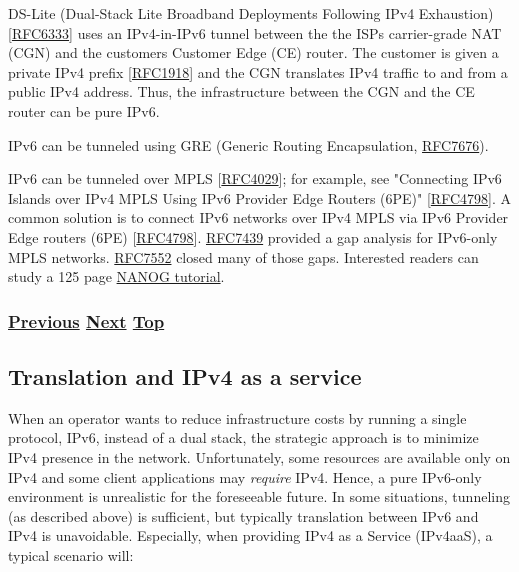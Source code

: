\documentclass[
]{article}
\begin{document}
DS-Lite (Dual-Stack Lite Broadband Deployments Following IPv4
Exhaustion)
{[}\href{https://www.rfc-editor.org/info/rfc6333}{RFC6333}{]} uses an
IPv4-in-IPv6 tunnel between the the ISP\textquotesingle s carrier-grade
NAT (CGN) and the customer\textquotesingle s Customer Edge (CE) router.
The customer is given a private IPv4 prefix
{[}\href{https://www.rfc-editor.org/info/rfc1918}{RFC1918}{]} and the
CGN translates IPv4 traffic to and from a public IPv4 address. Thus, the
infrastructure between the CGN and the CE router can be pure IPv6.

IPv6 can be tunneled using GRE (Generic Routing Encapsulation,
\href{https://www.rfc-editor.org/info/rfc7676}{RFC7676}).

IPv6 can be tunneled over MPLS
{[}\href{https://www.rfc-editor.org/info/rfc4029}{RFC4029}{]}; for
example, see "Connecting IPv6 Islands over IPv4 MPLS Using IPv6 Provider
Edge Routers (6PE)"
{[}\href{https://www.rfc-editor.org/info/rfc4798}{RFC4798}{]}. A common
solution is to connect IPv6 networks over IPv4 MPLS via IPv6 Provider
Edge routers (6PE)
{[}\href{https://www.rfc-editor.org/info/rfc4798}{RFC4798}{]}.
\href{https://www.rfc-editor.org/info/rfc7439}{RFC7439} provided a gap
analysis for IPv6-only MPLS networks.
\href{https://www.rfc-editor.org/info/rfc7552}{RFC7552} closed many of
those gaps. Interested readers can study a 125 page
\href{https://pc.nanog.org/static/published/meetings/NANOG76/1993/20190612_Agahian_Demystifying_Ipv6_Over_v1.pdf}{NANOG
tutorial}.

\subsubsection{\texorpdfstring{\hyperref[dual-stack-scenarios]{Previous}
\hyperref[translation-and-ipv4-as-a-service]{Next}
\hyperref[coexistence-with-legacy-ipv4]{Top}}{Previous Next Top}}\label{previous-next-top-17}

\pagebreak

\subsection{Translation and IPv4 as a
service}\label{translation-and-ipv4-as-a-service}

When an operator wants to reduce infrastructure costs by running a
single protocol, IPv6, instead of a dual stack, the strategic approach
is to minimize IPv4 presence in the network. Unfortunately, some
resources are available only on IPv4 and some client applications may
\emph{require} IPv4. Hence, a pure IPv6-only environment is unrealistic
for the foreseeable future. In some situations, tunneling (as described
above) is sufficient, but typically translation between IPv6 and IPv4 is
unavoidable. Especially, when providing IPv4 as a Service (IPv4aaS), a
typical scenario will:
\end{document}
